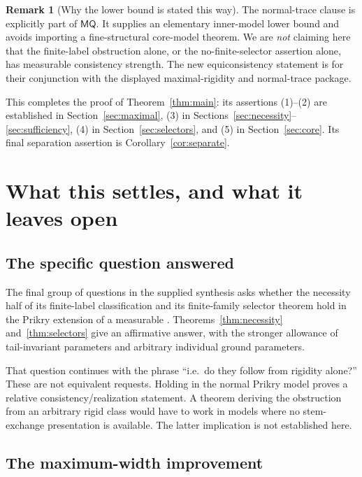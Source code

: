 \documentclass[11pt,letterpaper]{article}
\theoremstyle{definition}
\newtheorem{remark}[definition]{Remark}
\numberwithin{equation}{section}
\newcommand{\MQ}{\mathsf{MQ}}
\begin{document}
\begin{remark}[Why the lower bound is stated this way]
The normal-trace clause is explicitly part of $\MQ$. It supplies an elementary inner-model lower bound and avoids importing a fine-structural core-model theorem. We are \emph{not} claiming here that the finite-label obstruction alone, or the no-finite-selector assertion alone, has measurable consistency strength. The new equiconsistency statement is for their conjunction with the displayed maximal-rigidity and normal-trace package.
\end{remark}

This completes the proof of Theorem~\ref{thm:main}: its assertions (1)--(2) are established in Section~\ref{sec:maximal}, (3) in Sections~\ref{sec:necessity}--\ref{sec:sufficiency}, (4) in Section~\ref{sec:selectors}, and (5) in Section~\ref{sec:core}. Its final separation assertion is Corollary~\ref{cor:separate}.

\section{What this settles, and what it leaves open}\label{sec:scope}

\subsection{The specific question answered}

The final group of questions in the supplied synthesis asks whether the necessity half of its finite-label classification and its finite-family selector theorem hold in the Prikry extension of a measurable \cite{synthesis}. Theorems~\ref{thm:necessity} and~\ref{thm:selectors} give an affirmative answer, with the stronger allowance of tail-invariant parameters and arbitrary individual ground parameters.

That question continues with the phrase ``i.e.\ do they follow from rigidity alone?'' These are not equivalent requests. Holding in the normal Prikry model proves a relative consistency/realization statement. A theorem deriving the obstruction from an arbitrary rigid class would have to work in models where no stem-exchange presentation is available. The latter implication is not established here.

\subsection{The maximum-width improvement}
\end{document}
